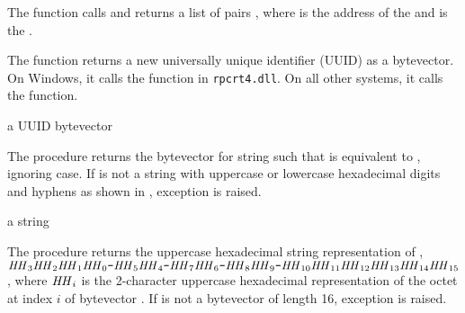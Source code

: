 \begin{function}
\end{function}

The  function calls  and
returns a list of pairs , where
 is the address of the  and 
is the .

\begin{function}
\end{function}

The  function returns a new universally unique
identifier (UUID) as a bytevector. On Windows, it calls the
 function in \texttt{rpcrt4.dll}. On all other
systems, it calls the  function.

\begin{procedure}
\end{procedure}
\returns{} a UUID bytevector

The  procedure returns the bytevector 
for string  such that  is
equivalent to , ignoring case. If  is not a string with
uppercase or lowercase hexadecimal digits and hyphens as shown in
, exception 
is raised.

\begin{procedure}
\end{procedure}
\returns{} a string

The  procedure returns the uppercase hexadecimal
string representation of ,
$\var{HH}_3\var{HH}_2\var{HH}_1\var{HH}_0\code{-}\var{HH}_5\var{HH}_4\code{-}\var{HH}_7\var{HH}_6\code{-}\var{HH}_8\var{HH}_9\code{-}\var{HH}_{10}\var{HH}_{11}\var{HH}_{12}\var{HH}_{13}\var{HH}_{14}\var{HH}_{15}$,
where $\var{HH}_i$ is the 2-character uppercase hexadecimal
representation of the octet at index $i$ of bytevector .  If
 is not a bytevector of length 16, exception
 is raised.

\begin{function}
\end{function}

